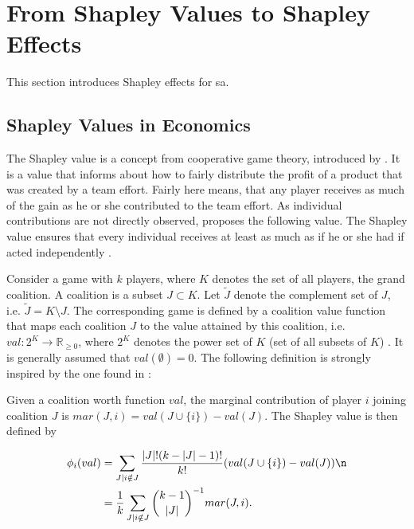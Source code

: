 \section{From Shapley Values to Shapley Effects}

This section introduces Shapley effects for sa.

\subsection{Shapley Values in Economics}

The Shapley value is a concept from cooperative game theory, introduced by \cite{S53}. It is a value that informs about how to fairly distribute the profit of a product that was created by a team effort. Fairly here means, that any player receives as much of the gain as he or she contributed to the team effort. As individual contributions are not directly observed, \cite{S53} proposes the following value. The Shapley value ensures that every individual receives at least as much as if he or she had if acted independently \cite{IP19}.

Consider a game with $k$ players, where $K$ denotes the set of all players, the grand coalition. A coalition is a subset $J \subset K$. Let $\tilde J$ denote the complement set of $J$, i.e. $\tilde J = K \setminus{J}$. The corresponding game is defined by a coalition value function that maps each coalition $J$ to the value attained by this coalition, i.e. $val: 2^K \to \mathbb{R}_{\geq 0}$, where $2^K$ denotes the power set of $K$ (set of all subsets of $K$) \cite{SNS16}. It is generally assumed that $val(\emptyset) = 0$. The following definition is strongly inspired by the one found in \cite{PRB20}:

\begin{definition}

Given a coalition worth function $val$, the marginal contribution of player $i$ joining coalition $J$ is $mar(J, i)=val(J \cup \{i\}) - val(J)$. The Shapley value is then defined by

\begin{equation}
\begin{split}
\phi_{i} (val)& = \sum_{J \mid i \notin J} \frac{\vert J \vert ! (k - \vert J \vert - 1) ! }{ k !} (val(J \cup \{i\}) - val(J)) \n \\
& = \frac{1}{k} \sum_{J \mid i \notin J} \binom{k-1}{\vert J \vert}^{-1} mar(J, i).
\end{split}
\end{equation}

\end{definition}

